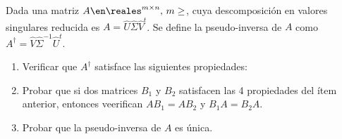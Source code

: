 \begin{enunciado}{\ejercicio}
  Dada una matriz $A \en \reales^{m \times n},\, m\geq$, cuya descomposición en valores singulares reducida
  es $A = \hat{U}\hat{\Sigma}\hat{V}^t$. Se define la pseudo-inversa de $A$ como $A^\dagger = \hat{V}\hat{\Sigma}^{-1}\hat{U}^t$.
  \begin{enumerate}[label=(\alph*)]
    \item Verificar que $A^\dagger$ satisface las siguientes propiedades:
          \begin{enumerate}[label=\roman*.]
          \end{enumerate}

    \item Probar que si dos matrices $B_1$ y $B_2$ satisfacen las 4 propiedades del ítem anterior,
          entonces veerifican $AB_1 = AB_2$ y $B_1A = B_2A$.

    \item Probar que la pseudo-inversa de $A$ es única.
  \end{enumerate}
\end{enunciado}

